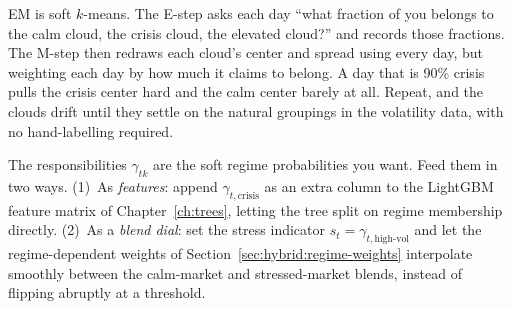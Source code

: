 \begin{intuition}
EM is soft $k$-means.  The E-step asks each day ``what fraction of you
belongs to the calm cloud, the crisis cloud, the elevated cloud?'' and
records those fractions.  The M-step then redraws each cloud's center and
spread using every day, but weighting each day by how much it claims to
belong.  A day that is 90\% crisis pulls the crisis center hard and the
calm center barely at all.  Repeat, and the clouds drift until they settle
on the natural groupings in the volatility data, with no hand-labelling
required.
\end{intuition}

\begin{projectconnection}
The responsibilities $\gamma_{tk}$ are the soft regime probabilities you
want.  Feed them in two ways.  (1)~As \emph{features}: append
$\gamma_{t,\text{crisis}}$ as an extra column to the LightGBM feature
matrix of Chapter~\ref{ch:trees}, letting the tree split on regime
membership directly.  (2)~As a \emph{blend dial}: set the stress indicator
$s_t = \gamma_{t,\text{high-vol}}$ and let the regime-dependent weights of
Section~\ref{sec:hybrid:regime-weights} interpolate smoothly between the
calm-market and stressed-market blends, instead of flipping abruptly at a
threshold.
\end{projectconnection}

